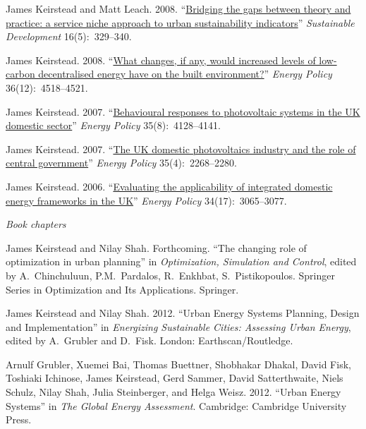 \documentclass[11pt,a4paper]{article}
\begin{document}
\ind James Keirstead and Matt Leach.  2008. ``\href{http://dx.doi.org/10.1002/sd.349}{Bridging the gaps between theory and practice: a service niche approach to urban sustainability indicators}'' \emph{Sustainable Development} 16(5):~329--340.

\ind James Keirstead. 2008. ``\href{http://dx.doi.org/10.1016/j.enpol.2008.09.019}{What changes, if any, would increased levels of low-carbon decentralised energy have on the built environment?}'' \emph{Energy Policy} 36(12):~4518--4521.

\ind James Keirstead. 2007. ``\href{http://dx.doi.org/10.1016/j.enpol.2007.02.019}{Behavioural responses to photovoltaic systems in the UK domestic sector}'' \emph{Energy Policy} 35(8):~4128--4141.

\ind James Keirstead. 2007. ``\href{http://dx.doi.org/10.1016/j.enpol.2006.08.003}{The UK domestic photovoltaics industry and the role of central government}'' \emph{Energy Policy} 35(4):~2268--2280.

\ind James Keirstead. 2006. ``\href{http://dx.doi.org/10.1016/j.enpol.2005.06.004}{Evaluating the applicability of integrated domestic energy frameworks in the UK}'' \emph{Energy Policy} 34(17):~3065--3077.

\bigskip

\noindent\emph{Book chapters \vspace{0.01in}}


\ind James Keirstead and Nilay Shah. Forthcoming. ``The changing role of optimization in urban planning'' in \emph{Optimization, Simulation and Control}, edited by A.\ Chinchuluun, P.M.\ Pardalos, R.\ Enkhbat, S.\ Pistikopoulos.  Springer Series in Optimization and Its Applications.  Springer.

\ind James Keirstead and Nilay Shah. 2012. ``Urban Energy Systems Planning, Design and Implementation'' in \emph{Energizing Sustainable Cities: Assessing Urban Energy}, edited by A.\ Grubler and D.\ Fisk. London: Earthscan/Routledge.

\ind Arnulf Grubler, Xuemei Bai, Thomas Buettner, Shobhakar Dhakal, David Fisk, Toshiaki Ichinose, James Keirstead, Gerd Sammer, David Satterthwaite, Niels Schulz, Nilay Shah, Julia Steinberger, and Helga Weisz. 2012. ``Urban Energy Systems'' in \emph{The Global Energy Assessment}. Cambridge: Cambridge University Press.
\end{document}
